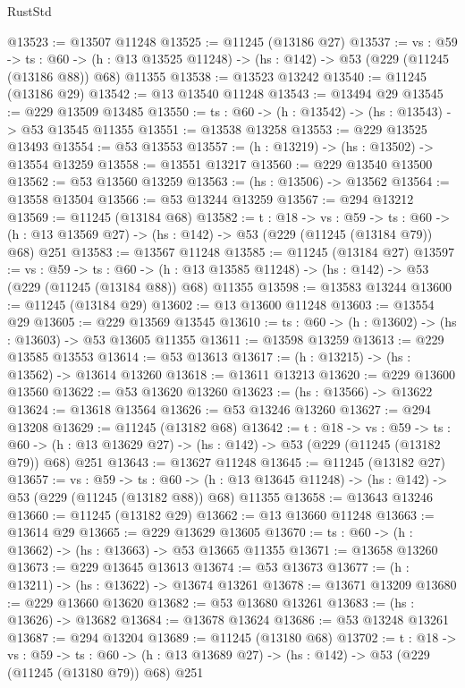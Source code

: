 \begin{lexlean}{RustStd}
\begin{coremodule}
@13523 := @13507 @11248
@13525 := @11245 (@13186 @27)
@13537 := {vs : @59} ->
  {ts : @60} ->
  (h : @13 @13525 @11248) -> (hs : @142) -> @53 (@229 (@11245 (@13186 @88)) @68) @11355
@13538 := @13523 @13242
@13540 := @11245 (@13186 @29)
@13542 := @13 @13540 @11248
@13543 := @13494 @29
@13545 := @229 @13509 @13485
@13550 := {ts : @60} -> (h : @13542) -> (hs : @13543) -> @53 @13545 @11355
@13551 := @13538 @13258
@13553 := @229 @13525 @13493
@13554 := @53 @13553
@13557 := (h : @13219) -> (hs : @13502) -> @13554 @13259
@13558 := @13551 @13217
@13560 := @229 @13540 @13500
@13562 := @53 @13560 @13259
@13563 := (hs : @13506) -> @13562
@13564 := @13558 @13504
@13566 := @53 @13244 @13259
@13567 := @294 @13212
@13569 := @11245 (@13184 @68)
@13582 := {t : @18} ->
  {vs : @59} ->
  {ts : @60} -> (h : @13 @13569 @27) -> (hs : @142) -> @53 (@229 (@11245 (@13184 @79)) @68) @251
@13583 := @13567 @11248
@13585 := @11245 (@13184 @27)
@13597 := {vs : @59} ->
  {ts : @60} ->
  (h : @13 @13585 @11248) -> (hs : @142) -> @53 (@229 (@11245 (@13184 @88)) @68) @11355
@13598 := @13583 @13244
@13600 := @11245 (@13184 @29)
@13602 := @13 @13600 @11248
@13603 := @13554 @29
@13605 := @229 @13569 @13545
@13610 := {ts : @60} -> (h : @13602) -> (hs : @13603) -> @53 @13605 @11355
@13611 := @13598 @13259
@13613 := @229 @13585 @13553
@13614 := @53 @13613
@13617 := (h : @13215) -> (hs : @13562) -> @13614 @13260
@13618 := @13611 @13213
@13620 := @229 @13600 @13560
@13622 := @53 @13620 @13260
@13623 := (hs : @13566) -> @13622
@13624 := @13618 @13564
@13626 := @53 @13246 @13260
@13627 := @294 @13208
@13629 := @11245 (@13182 @68)
@13642 := {t : @18} ->
  {vs : @59} ->
  {ts : @60} -> (h : @13 @13629 @27) -> (hs : @142) -> @53 (@229 (@11245 (@13182 @79)) @68) @251
@13643 := @13627 @11248
@13645 := @11245 (@13182 @27)
@13657 := {vs : @59} ->
  {ts : @60} ->
  (h : @13 @13645 @11248) -> (hs : @142) -> @53 (@229 (@11245 (@13182 @88)) @68) @11355
@13658 := @13643 @13246
@13660 := @11245 (@13182 @29)
@13662 := @13 @13660 @11248
@13663 := @13614 @29
@13665 := @229 @13629 @13605
@13670 := {ts : @60} -> (h : @13662) -> (hs : @13663) -> @53 @13665 @11355
@13671 := @13658 @13260
@13673 := @229 @13645 @13613
@13674 := @53 @13673
@13677 := (h : @13211) -> (hs : @13622) -> @13674 @13261
@13678 := @13671 @13209
@13680 := @229 @13660 @13620
@13682 := @53 @13680 @13261
@13683 := (hs : @13626) -> @13682
@13684 := @13678 @13624
@13686 := @53 @13248 @13261
@13687 := @294 @13204
@13689 := @11245 (@13180 @68)
@13702 := {t : @18} ->
  {vs : @59} ->
  {ts : @60} -> (h : @13 @13689 @27) -> (hs : @142) -> @53 (@229 (@11245 (@13180 @79)) @68) @251

\end{coremodule}
\end{lexlean}
